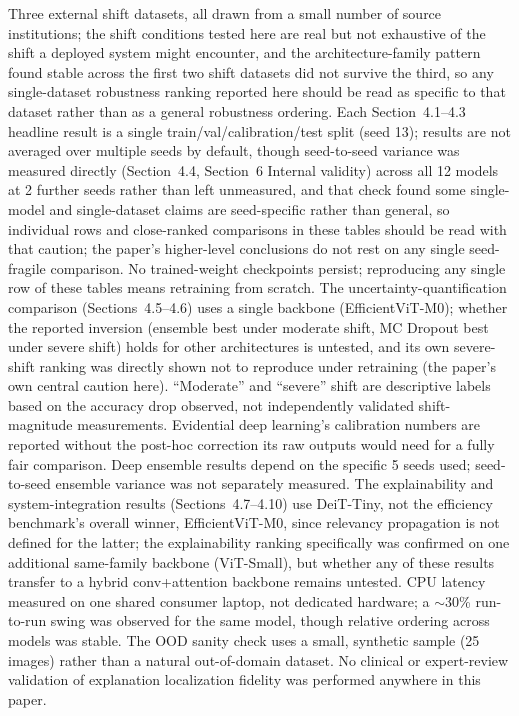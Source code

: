 \documentclass[runningheads]{llncs}
\begin{document}
Three external shift datasets, all drawn from a small number of source
institutions; the shift conditions tested here are real but not
exhaustive of the shift a deployed system might encounter, and the
architecture-family pattern found stable across the first two shift
datasets did not survive the third, so any single-dataset robustness
ranking reported here should be read as specific to that dataset rather
than as a general robustness ordering. Each Section~4.1--4.3 headline
result is a single train/val/calibration/test split (seed 13); results are
not averaged over multiple seeds by default, though seed-to-seed variance
was measured directly (Section~4.4, Section~6 Internal validity) across
all 12 models at 2 further seeds rather than left unmeasured, and that
check found some single-model and single-dataset claims are seed-specific
rather than general, so individual rows and close-ranked comparisons in
these tables should be read with that caution; the paper's higher-level
conclusions do not rest on any single seed-fragile comparison. No
trained-weight checkpoints persist; reproducing any single row of these
tables means retraining from scratch. The uncertainty-quantification
comparison (Sections~4.5--4.6) uses a single backbone (EfficientViT-M0);
whether the reported inversion (ensemble best under moderate shift, MC
Dropout best under severe shift) holds for other architectures is
untested, and its own severe-shift ranking was directly shown not to
reproduce under retraining (the paper's own central caution here).
``Moderate'' and ``severe'' shift are descriptive labels based on the
accuracy drop observed, not independently validated shift-magnitude
measurements. Evidential deep learning's calibration numbers are reported
without the post-hoc correction its raw outputs would need for a fully
fair comparison. Deep ensemble results depend on the specific 5 seeds
used; seed-to-seed ensemble variance was not separately measured. The
explainability and system-integration results (Sections~4.7--4.10) use
DeiT-Tiny, not the efficiency benchmark's overall winner, EfficientViT-M0,
since relevancy propagation is not defined for the latter; the
explainability ranking specifically was confirmed on one additional
same-family backbone (ViT-Small), but whether any of these results
transfer to a hybrid conv+attention backbone remains untested. CPU latency
measured on one shared consumer laptop, not dedicated hardware; a
$\sim$30\% run-to-run swing was observed for the same model, though
relative ordering across models was stable. The OOD sanity check uses a
small, synthetic sample (25 images) rather than a natural out-of-domain
dataset. No clinical or expert-review validation of explanation
localization fidelity was performed anywhere in this paper.
\end{document}
